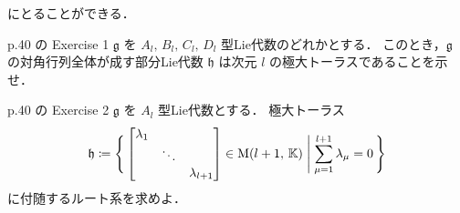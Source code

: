 \documentclass{ltjsarticle}
\makeatletter
\theoremstyle{mystyle} %
\renewcommand{\proofname}{証明}
\renewenvironment{proof}[1][\proofname]{\par
    \pushQED{\qed}%
    \normalfont \topsep6\p@\@plus6\p@\relax
    \trivlist
    \item[\hskip\labelsep
        \itshape
    \textbf{\underline{#1}}]\ignorespaces
}{%
    \popQED\endtrivlist\@endpefalse
}
\numberwithin{equation}{section}
\makeatother
\begin{document}
にとることができる．

\begin{myproblem}[label=ex:2-8-1]{p.40 の Exercise 1}
    $\mathfrak{g}$ を $A_l,\, B_l,\, C_l,\, D_l$ 型Lie代数のどれかとする．
    このとき，$\mathfrak{g}$ の対角行列全体が成す部分Lie代数 $\mathfrak{h}$ は次元 $l$ の極大トーラスであることを示せ．
\end{myproblem}



\begin{myproblem}[label=ex:2-8-2A]{p.40 の Exercise 2}
    $\mathfrak{g}$ を $A_l$ 型Lie代数とする．
    極大トーラス
    \begin{align}
        \mathfrak{h} \coloneqq \Biggl\{\, \mqty[\dmat{\lambda_1,\ddots,\lambda_{l+1}}] \in \Mat{l+1}{\mathbb{K}}\Biggm| \sum_{\mu=1}^{l+1} \lambda_\mu = 0 \,\Biggr\} 
    \end{align}
    に付随するルート系を求めよ．
\end{myproblem}
\end{document}
